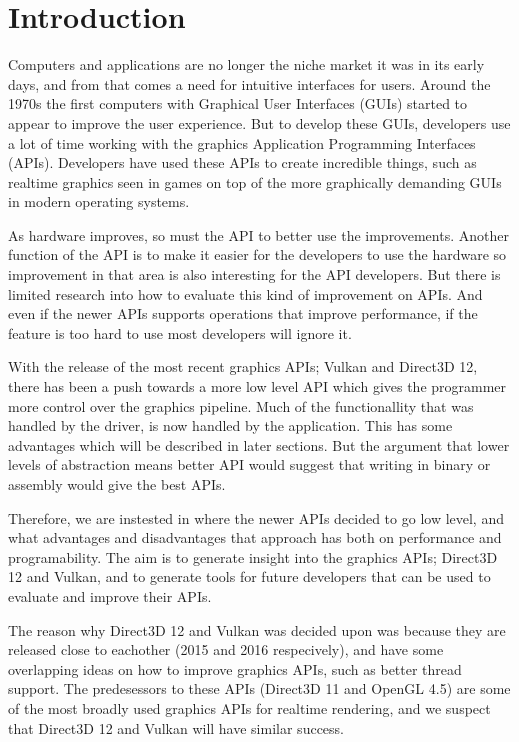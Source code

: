 \chapter{Introduction}\label{ch:introduction}

Computers and applications are no longer the niche market it was in its early days, and from that comes a need for intuitive interfaces for users. 
Around the 1970s the first computers with Graphical User Interfaces (GUIs) started to appear to improve the user experience.
But to develop these GUIs, developers use a lot of time working with the graphics Application Programming Interfaces (APIs).
Developers have used these APIs to create incredible things, such as realtime graphics seen in games on top of the more graphically demanding GUIs in modern operating systems.

As hardware improves, so must the API to better use the improvements.
Another function of the API is to make it easier for the developers to use the hardware so improvement in that area is also interesting for the API developers.
But there is limited research into how to evaluate this kind of improvement on APIs.
And even if the newer APIs supports operations that improve performance, if the feature is too hard to use most developers will ignore it.

With the release of the most recent graphics APIs; Vulkan and Direct3D 12, there has been a push towards a more low level API which gives the programmer more control over the graphics pipeline.
Much of the functionallity that was handled by the driver, is now handled by the application. 
This has some advantages which will be described in later sections. 
But the argument that lower levels of abstraction means better API would suggest that writing in binary or assembly would give the best APIs.

Therefore, we are instested in where the newer APIs decided to go low level, and what advantages and disadvantages that approach has both on performance and programability.
The aim is to generate insight into the graphics APIs; Direct3D 12 and Vulkan, and to generate tools for future developers that can be used to evaluate and improve their APIs.

The reason why Direct3D 12 and Vulkan was decided upon was because they are released close to eachother (2015 and 2016 respecively), and have some overlapping ideas on how to improve graphics APIs, such as better thread support.
The predesessors to these APIs (Direct3D 11 and OpenGL 4.5) are some of the most broadly used graphics APIs for realtime rendering, and we suspect that Direct3D 12 and Vulkan will have similar success.






